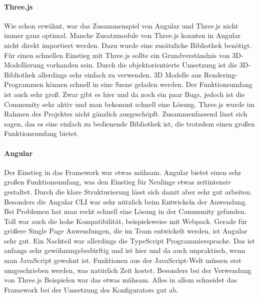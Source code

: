 \paragraph{Three.js}
Wie schon erwähnt, war das Zusammenspiel von Angular und Three.js nicht immer ganz optimal. Manche Zusatzmodule von Three.js konnten in Angular nicht direkt importiert werden. Dazu wurde eine zusätzliche Bibliothek benötigt. Für einen schnellen Einstieg mit Three.js sollte ein Grundverständnis von 3D-Modellierung vorhanden sein. Durch die objektorientierte Umsetzung ist die 3D-Bibliothek allerdings sehr einfach zu verwenden. 3D Modelle aus Rendering-Programmen können schnell in eine Szene geladen werden. Der Funktionsumfang ist auch sehr groß. Zwar gibt es hier und da noch ein paar Bugs, jedoch ist die Community sehr aktiv und man bekommt schnell eine Lösung. Three.js wurde im Rahmen des Projektes nicht gänzlich ausgeschöpft. Zusammenfassend lässt sich sagen, das es eine einfach zu bedienende Bibliothek ist, die trotzdem einen großen Funktionsumfang bietet.
\paragraph{Angular}
Der Einstieg in das Framework war etwas mühsam. Angular bietet einen sehr großen Funktionsumfang, was den Einstieg für Neulinge etwas zeitintensiv gestaltet. Durch die klare Strukturierung lässt sich damit aber sehr gut arbeiten. Besonders die Angular CLI war sehr nützlich beim Entwickeln der Anwendung. Bei Problemen hat man recht schnell eine Lösung in der Community gefunden. Toll war auch die hohe Kompatibilität, beispielsweise mit Webpack. Gerade für größere Single Page Anwendungen, die im Team entwickelt werden, ist Angular sehr gut. Ein Nachteil war allerdings die TypeScript Programmiersprache. Das ist anfangs sehr gewöhnungsbedürftig und ist hier und da auch unpraktisch, wenn man JavaScript gewohnt ist. Funktionen aus der JavaScript-Welt müssen erst umgeschrieben werden, was natürlich Zeit kostet. Besonders bei der Verwendung von Three.js Beispielen war das etwas mühsam. Alles in allem schneidet das Framework bei der Umsetzung des Konfigurators gut ab.
